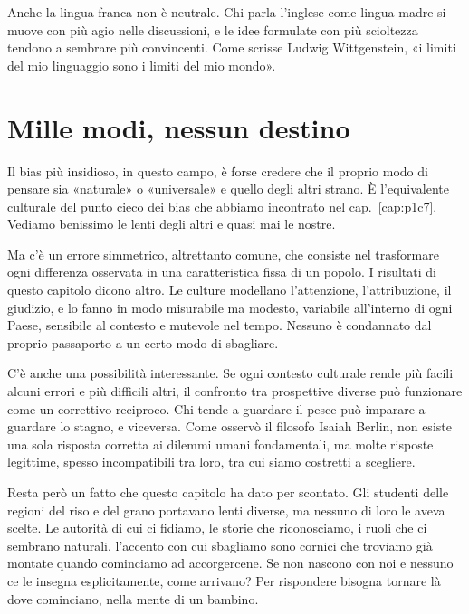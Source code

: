 Anche la lingua franca non è neutrale. Chi parla l'inglese come lingua madre si muove con più agio nelle discussioni, e le idee formulate con più scioltezza tendono a sembrare più convincenti. Come scrisse Ludwig Wittgenstein, «i limiti del mio linguaggio sono i limiti del mio mondo».

\section{Mille modi, nessun destino}

Il bias più insidioso, in questo campo, è forse credere che il proprio modo di pensare sia «naturale» o «universale» e quello degli altri strano. È l'equivalente culturale del punto cieco dei bias che abbiamo incontrato nel cap.~\ref{cap:p1c7}. Vediamo benissimo le lenti degli altri e quasi mai le nostre.

Ma c'è un errore simmetrico, altrettanto comune, che consiste nel trasformare ogni differenza osservata in una caratteristica fissa di un popolo. I risultati di questo capitolo dicono altro. Le culture modellano l'attenzione, l'attribuzione, il giudizio, e lo fanno in modo misurabile ma modesto, variabile all'interno di ogni Paese, sensibile al contesto e mutevole nel tempo. Nessuno è condannato dal proprio passaporto a un certo modo di sbagliare.

C'è anche una possibilità interessante. Se ogni contesto culturale rende più facili alcuni errori e più difficili altri, il confronto tra prospettive diverse può funzionare come un correttivo reciproco. Chi tende a guardare il pesce può imparare a guardare lo stagno, e viceversa. Come osservò il filosofo Isaiah Berlin, non esiste una sola risposta corretta ai dilemmi umani fondamentali, ma molte risposte legittime, spesso incompatibili tra loro, tra cui siamo costretti a scegliere.

Resta però un fatto che questo capitolo ha dato per scontato. Gli studenti delle regioni del riso e del grano portavano lenti diverse, ma nessuno di loro le aveva scelte. Le autorità di cui ci fidiamo, le storie che riconosciamo, i ruoli che ci sembrano naturali, l'accento con cui sbagliamo sono cornici che troviamo già montate quando cominciamo ad accorgercene. Se non nascono con noi e nessuno ce le insegna esplicitamente, come arrivano? Per rispondere bisogna tornare là dove cominciano, nella mente di un bambino.
